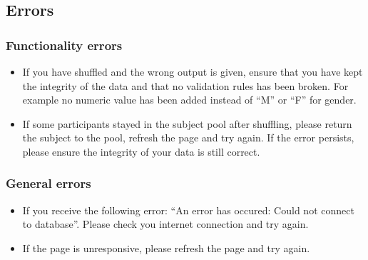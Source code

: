 \subsection{Errors}
\subsubsection{Functionality errors}
\begin{itemize}
\item If you have shuffled and the wrong output is given, ensure that you have kept the integrity of the data and that no validation rules has been broken. For example no numeric value has been added instead of ``M'' or ``F'' for gender.
\item If some participants stayed in the subject pool after shuffling, please return the subject to the pool, refresh the page and try again. If the error persists, please ensure the integrity of your data is still correct.

\end{itemize}
\subsubsection{General errors}
\begin{itemize}
\item If you receive the following error: ``An error has occured: Could not connect to database''. Please check you internet connection and try again.
\item If the page is unresponsive, please refresh the page and try again.

\end{itemize}